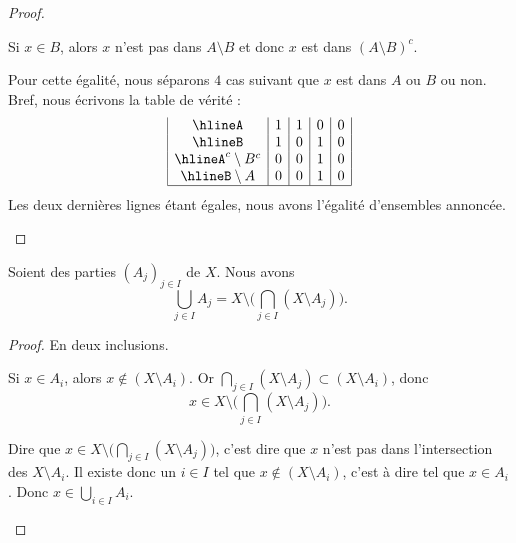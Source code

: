 \begin{proof}
\begin{subproof}
\begin{subproof}
			Si \( x\in B\), alors \( x\) n'est pas dans \( A\setminus B\) et donc \( x\) est dans \( (A\setminus B)^c\).
		\end{subproof}
		Pour cette égalité, nous séparons \( 4\) cas suivant que \( x\) est dans \( A\) ou \( B\) ou non. Bref, nous écrivons la table de vérité :
		\begin{equation}
			\begin{array}{|c|c|c|c|c|}
				\hline%
				A                & 1 & 1 & 0 & 0 \\
				\hline%
				B                & 1 & 0 & 1 & 0 \\
				\hline%
				A^c\setminus B^c & 0 & 0 & 1 & 0 \\
				\hline%
				B\setminus A     & 0 & 0 & 1 & 0 \\
				\hline%
			\end{array}
		\end{equation}
		Les deux dernières lignes étant égales, nous avons l'égalité d'ensembles annoncée.
	\end{subproof}
\end{proof}

\begin{lemma}	\label{LEMooMDTPooAhmYqv}
	Soient des parties \( (A_j)_{j\in I}\) de \( X\). Nous avons
	\begin{equation}
		\bigcup_{j\in I}A_j=X\setminus\Big( \bigcap_{j\in I}(X\setminus A_j) \Big).
	\end{equation}
\end{lemma}

\begin{proof}
	En deux inclusions.
	\begin{subproof}
		Si \( x\in A_i\), alors \( x\not\in (X\setminus A_i)\). Or \( \bigcap_{j\in I}(X\setminus A_j)\subset (X\setminus A_i)\), donc
		\begin{equation}
			x\in  X\setminus\Big( \bigcap_{j\in I}(X\setminus A_j) \Big).
		\end{equation}

		Dire que \( x\in  X\setminus\Big( \bigcap_{j\in I}(X\setminus A_j) \Big)\), c'est dire que \( x\) n'est pas dans l'intersection des \( X\setminus A_i\). Il existe donc un \( i\in I\) tel que \( x\notin (X\setminus A_i)\), c'est à dire tel que \( x\in A_i\). Donc \( x\in\bigcup_{i\in I}A_i\).
	\end{subproof}
\end{proof}

